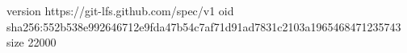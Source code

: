 version https://git-lfs.github.com/spec/v1
oid sha256:552b538e992646712e9fda47b54c7af71d91ad7831c2103a1965468471235743
size 22000
